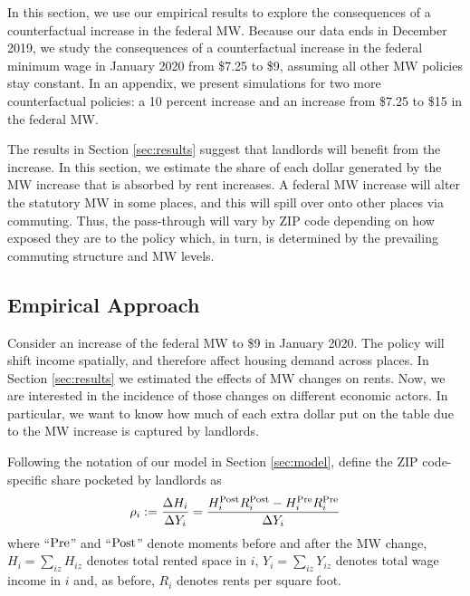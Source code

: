 
In this section, we use our empirical results to explore the consequences of 
a counterfactual increase in the federal MW.
Because our data ends in December 2019, we study the consequences of a 
counterfactual increase in the federal minimum wage in January 2020 from 
\$7.25 to \$9, assuming all other MW policies stay constant. 
In an appendix, we present simulations for two more counterfactual policies: 
a 10 percent increase and an increase from \$7.25 to \$15 in the federal MW.

The results in Section \ref{sec:results} suggest that landlords will benefit
from the increase. 
In this section, we estimate the share of each dollar generated by the MW 
increase that is absorbed by rent increases.
A federal MW increase will alter the statutory MW in some places, and this will
spill over onto other places via commuting.
Thus, the pass-through will vary by ZIP code depending on how exposed they
are to the policy which, in turn, is determined by the prevailing commuting
structure and MW levels.


\subsection{Empirical Approach}\label{sec:emp_cf}

Consider an increase of the federal MW to \$9 in January 2020.
The policy will shift income spatially, and therefore affect housing demand
across places.
In Section \ref{sec:results} we estimated the effects of MW changes on rents.
Now, we are interested in the incidence of those changes on different economic
actors.
In particular, we want to know how much of each extra dollar put on the table 
due to the MW increase is captured by landlords.

Following the notation of our model in Section \ref{sec:model}, define the 
ZIP code-specific share pocketed by landlords as
\begin{equation*}
    \rho_i := \frac{\Delta H_i}{\Delta Y_i} 
            = \frac{H^{\text{Post}}_i R^{\text{Post}}_i - H^{\text{Pre}}_i R^{\text{Pre}}_i}{\Delta Y_i} 
\end{equation*}
where
``$\text{Pre}$'' and ``$\text{Post}$'' denote moments before and after the MW change,
$H_i = \sum_{iz} H_{iz}$ denotes total rented space in $i$, 
$Y_i = \sum_{iz} Y_{iz}$ denotes total wage income in $i$ 
and, as before,
$R_i$ denotes rents per square foot.

